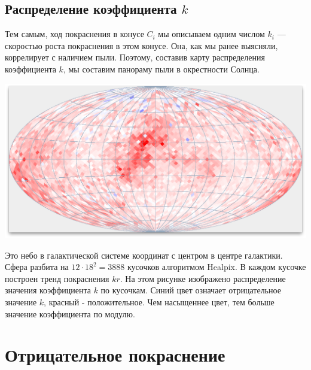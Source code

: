 \documentclass[14pt]{article}
\begin{document}
        \subsection{Распределение коэффициента $k$}
            Тем самым, ход покраснения в конусе $C_i$ мы описываем одним числом $k_i$ --- скоростью роста покраснения в этом конусе. Она, как мы ранее выясняли, коррелирует с наличием пыли. Поэтому, составив карту распределения коэффициента $k$, мы составим панораму пыли в окрестности Солнца. 
            \begin{center}
                \includegraphics[scale=0.3]{../../presentation/map-k.png}
            \end{center}
            Это небо в галактической системе координат с центром в центре галактики. Сфера разбита на $12 \cdot 18^2 = 3888$ кусочков алгоритмом Healpix. В каждом кусочке построен тренд покраснения $k r$. На этом рисунке изображено распределение значения коэффициента $k$ по кусочкам. Синий цвет означает отрицательное значение $k$, красный - положительное. Чем насыщеннее цвет, тем больше значение коэффициента по модулю.  

    \section{Отрицательное покраснение}
        
\end{document}
